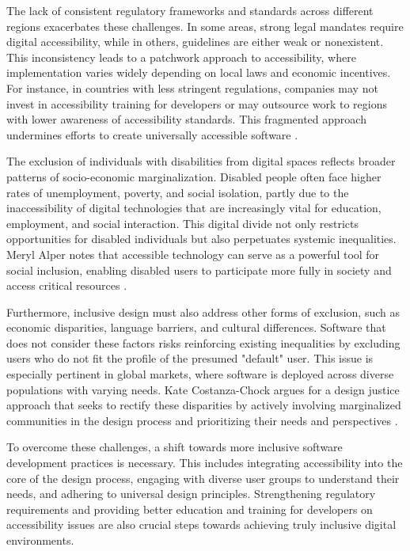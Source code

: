 \begin{refsection}
The lack of consistent regulatory frameworks and standards across different regions exacerbates these challenges. In some areas, strong legal mandates require digital accessibility, while in others, guidelines are either weak or nonexistent. This inconsistency leads to a patchwork approach to accessibility, where implementation varies widely depending on local laws and economic incentives. For instance, in countries with less stringent regulations, companies may not invest in accessibility training for developers or may outsource work to regions with lower awareness of accessibility standards. This fragmented approach undermines efforts to create universally accessible software \cite[pp.~150-153]{cooper2012designing}.

The exclusion of individuals with disabilities from digital spaces reflects broader patterns of socio-economic marginalization. Disabled people often face higher rates of unemployment, poverty, and social isolation, partly due to the inaccessibility of digital technologies that are increasingly vital for education, employment, and social interaction. This digital divide not only restricts opportunities for disabled individuals but also perpetuates systemic inequalities. Meryl Alper notes that accessible technology can serve as a powerful tool for social inclusion, enabling disabled users to participate more fully in society and access critical resources \cite[pp.~42-45]{alper2017giving}.

Furthermore, inclusive design must also address other forms of exclusion, such as economic disparities, language barriers, and cultural differences. Software that does not consider these factors risks reinforcing existing inequalities by excluding users who do not fit the profile of the presumed "default" user. This issue is especially pertinent in global markets, where software is deployed across diverse populations with varying needs. Kate Costanza-Chock argues for a design justice approach that seeks to rectify these disparities by actively involving marginalized communities in the design process and prioritizing their needs and perspectives \cite[pp.~78-81]{costanza2020inclusive}.

To overcome these challenges, a shift towards more inclusive software development practices is necessary. This includes integrating accessibility into the core of the design process, engaging with diverse user groups to understand their needs, and adhering to universal design principles. Strengthening regulatory requirements and providing better education and training for developers on accessibility issues are also crucial steps towards achieving truly inclusive digital environments.


\end{refsection}
